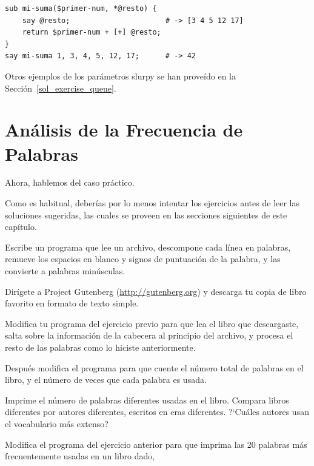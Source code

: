 \begin{verbatim}
sub mi-suma($primer-num, *@resto) {
    say @resto;                      # -> [3 4 5 12 17]
    return $primer-num + [+] @resto;
}
say mi-suma 1, 3, 4, 5, 12, 17;      # -> 42 
\end{verbatim}

Otros ejemplos de los parámetros slurpy se han proveído
en la Sección~\ref{sol_exercise_queue}.

\section{Análisis de la Frecuencia de Palabras}
\label{analysis}

Ahora, hablemos del caso práctico.

Como es habitual, deberías por lo menos intentar los
ejercicios antes de leer las soluciones sugeridas, las cuales
se proveen en las secciones siguientes de este capítulo.

\begin{exercise}

Escribe un programa que lee un archivo, descompone cada línea en palabras,
remueve los espacios en blanco y signos de puntuación de la palabra,
y las convierte a palabras minúsculas.

\end{exercise}


\begin{exercise}

Dirígete a Project Gutenberg (\url{http://gutenberg.org}) y descarga tu 
copia de libro favorito en formato de texto simple.

Modifica tu programa del ejercicio previo para que lea el libro que descargaste,
salta sobre la información de la cabecera al principio del archivo, y procesa el 
resto de las palabras como lo hiciste anteriormente.

Después modifica el programa para que cuente el número total de palabras en
el libro, y el número de veces que cada palabra es usada.

Imprime el número de palabras diferentes usadas en el libro. Compara
libros diferentes por autores diferentes, escritos en eras diferentes. 
?`Cuáles autores usan el vocabulario más extenso?
\end{exercise}


\begin{exercise}

Modifica el programa del ejercicio anterior para que imprima las
20 palabras más frecuentemente usadas en un libro dado,

\end{exercise}


